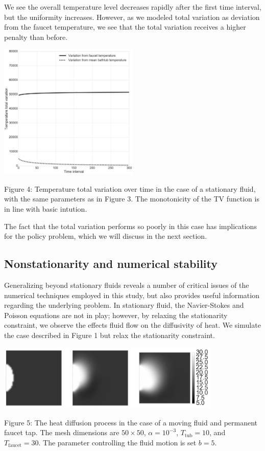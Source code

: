 \documentclass[12pt]{amsart}
\begin{document}
We see the overall temperature level decreases rapidly after the first time
interval, but the uniformity increases.  However, as we modeled total variation
as deviation from the faucet temperature, we see that the total variation
receives a higher penalty than before.

\begin{center}
    \includegraphics[width=0.5\textwidth]{../plots/tv-02.png}

    \justify
    \footnotesize{
    Figure 4: Temperature total variation over time in the case of a stationary
    fluid, with the same parameters as in Figure 3. The monotonicity of the TV
function is in line with basic intution.}
\end{center}
The fact that the total variation performs so poorly in this case has
implications for the policy problem, which we will discuss in the next section.

\subsection{Nonstationarity and numerical stability}

Generalizing beyond stationary fluids reveals a number of critical issues of the
numerical techniques employed in this study, but also provides useful
information regarding the underlying problem. In stationary fluid, the
Navier-Stokes and Poisson equations are not in play; however, by relaxing the
stationarity constraint, we observe the effects fluid flow on the diffusivity of
heat. We simulate the case described in Figure 1 but relax the stationarity constraint.

\begin{center}
    \includegraphics[width=0.8\textwidth]{../plots/diffusion-03.png}

    \justify
    \footnotesize{
    Figure 5: The heat diffusion process in the case of a moving fluid and
    permanent faucet tap. The mesh dimensions are $50 \times 50$, $\alpha =
    10^{-3}$, $T_{\mathrm{tub}} = 10$, and $T_{\mathrm{faucet}} = 30$. The
parameter controlling the fluid motion is set $b = 5$.}
\end{center}
\end{document}
